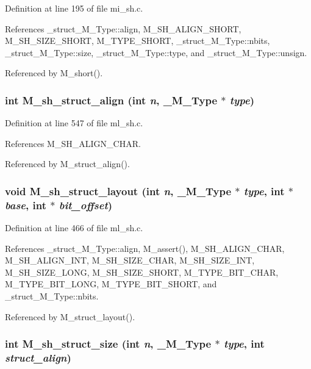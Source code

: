 Definition at line 195 of file mi\_\-sh.c.

References \_\-struct\_\-M\_\-Type::align, M\_\-SH\_\-ALIGN\_\-SHORT, M\_\-SH\_\-SIZE\_\-SHORT, M\_\-TYPE\_\-SHORT, \_\-struct\_\-M\_\-Type::nbits, \_\-struct\_\-M\_\-Type::size, \_\-struct\_\-M\_\-Type::type, and \_\-struct\_\-M\_\-Type::unsign.

Referenced by M\_\-short().
\subsubsection{\setlength{\rightskip}{0pt plus 5cm}int M\_\-sh\_\-struct\_\-align (int {\em n}, \bf{\_\-M\_\-Type} $\ast$ {\em type})}\label{m__sh_8h_db0c41a755057f015d9343208a7f877b}




Definition at line 547 of file ml\_\-sh.c.

References M\_\-SH\_\-ALIGN\_\-CHAR.

Referenced by M\_\-struct\_\-align().
\subsubsection{\setlength{\rightskip}{0pt plus 5cm}void M\_\-sh\_\-struct\_\-layout (int {\em n}, \bf{\_\-M\_\-Type} $\ast$ {\em type}, int $\ast$ {\em base}, int $\ast$ {\em bit\_\-offset})}\label{m__sh_8h_11e8c23a78204ef9d4016643a149a58d}




Definition at line 466 of file ml\_\-sh.c.

References \_\-struct\_\-M\_\-Type::align, M\_\-assert(), M\_\-SH\_\-ALIGN\_\-CHAR, M\_\-SH\_\-ALIGN\_\-INT, M\_\-SH\_\-SIZE\_\-CHAR, M\_\-SH\_\-SIZE\_\-INT, M\_\-SH\_\-SIZE\_\-LONG, M\_\-SH\_\-SIZE\_\-SHORT, M\_\-TYPE\_\-BIT\_\-CHAR, M\_\-TYPE\_\-BIT\_\-LONG, M\_\-TYPE\_\-BIT\_\-SHORT, and \_\-struct\_\-M\_\-Type::nbits.

Referenced by M\_\-struct\_\-layout().
\subsubsection{\setlength{\rightskip}{0pt plus 5cm}int M\_\-sh\_\-struct\_\-size (int {\em n}, \bf{\_\-M\_\-Type} $\ast$ {\em type}, int {\em struct\_\-align})}\label{m__sh_8h_bc23426ae0714651d0c225d3ad29ebc8}




